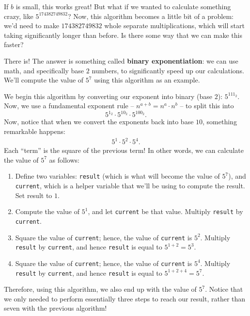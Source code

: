 \documentclass{article}
\begin{document}
\begin{multicols}{3}
If $b$ is small, this works great! But what if we wanted to calculate something crazy, like $5^{174382749832}$? Now, this algorithm becomes a little bit of a problem: we'd need to make $174382749832$ whole separate multiplications, which will start taking significantly longer than before. Is there some way that we can make this faster?

There is! The answer is something called \textbf{binary exponentiation}: we can use math, and specifically base $2$ numbers, to significantly speed up our calculations. We'll compute the value of $5^{7}$ using this algorithm as an example.

We begin this algorithm by converting our exponent into binary (base $2$): $5^{111_2}$. Now, we use a fundamental exponent rule -- $n^{a+b}=n^a\cdot n^b$ -- to split this into
\[5^{1_2}\cdot 5^{10_2}\cdot 5^{100_2}.\]
Now, notice that when we convert the exponents back into base $10$, something remarkable happens:
\begin{align*}
    5^{1}\cdot 5^{2}\cdot 5^{4}.
\end{align*}
Each ``term'' is the square of the previous term! In other words, we can calculate the value of $5^7$ as follows:
\begin{enumerate}
    \item Define two variables: \texttt{result} (which is what will become the value of $5^7$), and \texttt{current}, which is a helper variable that we'll be using to compute the result. Set result to $1$.
    
    \item Compute the value of $5^1$, and let \texttt{current} be that value. Multiply \texttt{result} by \texttt{current}.
    
    \item Square the value of \texttt{current}; hence, the value of \texttt{current} is $5^2$. Multiply \texttt{result} by \texttt{current}, and hence \texttt{result} is equal to $5^{1+2}=5^3$.
    
    \item Square the value of \texttt{current}; hence, the value of \texttt{current} is $5^4$. Multiply \texttt{result} by \texttt{current}, and hence \texttt{result} is equal to $5^{1+2+4}=5^7$.
\end{enumerate}

Therefore, using this algorithm, we also end up with the value of $5^7$. Notice that we only needed to perform essentially three steps to reach our result, rather than seven with the previous algorithm! 


\end{multicols}
\end{document}
